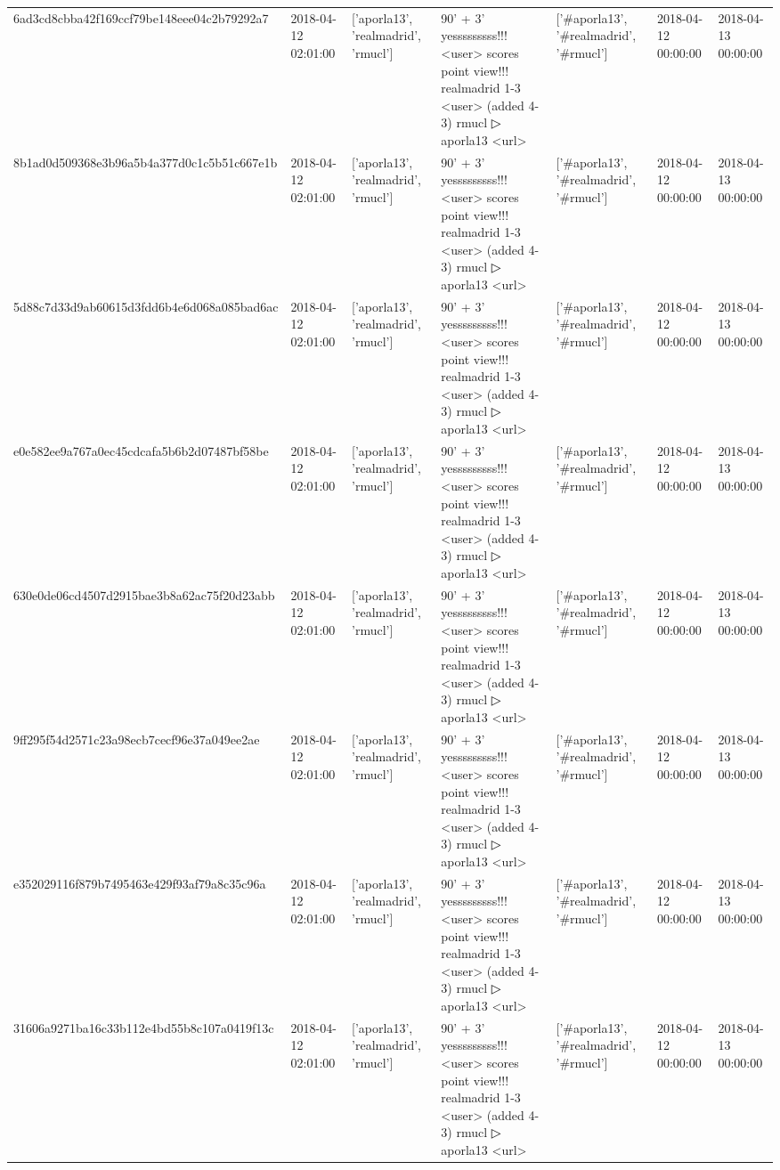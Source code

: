 \begin{tabular}{lllllll}
6ad3cd8cbba42f169ccf79be148eee04c2b79292a7 & 2018-04-12 02:01:00 & ['aporla13', 'realmadrid', 'rmucl'] & 90' + 3' yesssssssss!!! <user> scores point view!!! realmadrid 1-3 <user> (added 4-3) rmucl ▷ aporla13 <url> & ['#aporla13', '#realmadrid', '#rmucl'] & 2018-04-12 00:00:00 & 2018-04-13 00:00:00 \\
8b1ad0d509368e3b96a5b4a377d0c1c5b51c667e1b & 2018-04-12 02:01:00 & ['aporla13', 'realmadrid', 'rmucl'] & 90' + 3' yesssssssss!!! <user> scores point view!!! realmadrid 1-3 <user> (added 4-3) rmucl ▷ aporla13 <url> & ['#aporla13', '#realmadrid', '#rmucl'] & 2018-04-12 00:00:00 & 2018-04-13 00:00:00 \\
5d88c7d33d9ab60615d3fdd6b4e6d068a085bad6ac & 2018-04-12 02:01:00 & ['aporla13', 'realmadrid', 'rmucl'] & 90' + 3' yesssssssss!!! <user> scores point view!!! realmadrid 1-3 <user> (added 4-3) rmucl ▷ aporla13 <url> & ['#aporla13', '#realmadrid', '#rmucl'] & 2018-04-12 00:00:00 & 2018-04-13 00:00:00 \\
e0e582ee9a767a0ec45cdcafa5b6b2d07487bf58be & 2018-04-12 02:01:00 & ['aporla13', 'realmadrid', 'rmucl'] & 90' + 3' yesssssssss!!! <user> scores point view!!! realmadrid 1-3 <user> (added 4-3) rmucl ▷ aporla13 <url> & ['#aporla13', '#realmadrid', '#rmucl'] & 2018-04-12 00:00:00 & 2018-04-13 00:00:00 \\
630e0de06cd4507d2915bae3b8a62ac75f20d23abb & 2018-04-12 02:01:00 & ['aporla13', 'realmadrid', 'rmucl'] & 90' + 3' yesssssssss!!! <user> scores point view!!! realmadrid 1-3 <user> (added 4-3) rmucl ▷ aporla13 <url> & ['#aporla13', '#realmadrid', '#rmucl'] & 2018-04-12 00:00:00 & 2018-04-13 00:00:00 \\
9ff295f54d2571c23a98ecb7cecf96e37a049ee2ae & 2018-04-12 02:01:00 & ['aporla13', 'realmadrid', 'rmucl'] & 90' + 3' yesssssssss!!! <user> scores point view!!! realmadrid 1-3 <user> (added 4-3) rmucl ▷ aporla13 <url> & ['#aporla13', '#realmadrid', '#rmucl'] & 2018-04-12 00:00:00 & 2018-04-13 00:00:00 \\
e352029116f879b7495463e429f93af79a8c35c96a & 2018-04-12 02:01:00 & ['aporla13', 'realmadrid', 'rmucl'] & 90' + 3' yesssssssss!!! <user> scores point view!!! realmadrid 1-3 <user> (added 4-3) rmucl ▷ aporla13 <url> & ['#aporla13', '#realmadrid', '#rmucl'] & 2018-04-12 00:00:00 & 2018-04-13 00:00:00 \\
31606a9271ba16c33b112e4bd55b8c107a0419f13c & 2018-04-12 02:01:00 & ['aporla13', 'realmadrid', 'rmucl'] & 90' + 3' yesssssssss!!! <user> scores point view!!! realmadrid 1-3 <user> (added 4-3) rmucl ▷ aporla13 <url> & ['#aporla13', '#realmadrid', '#rmucl'] & 2018-04-12 00:00:00 & 2018-04-13 00:00:00 \\

\end{tabular}
